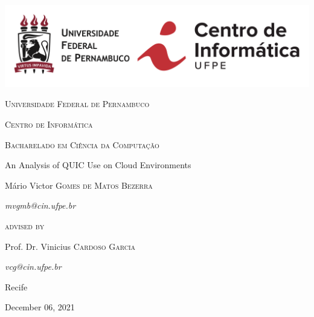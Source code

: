 \begin{titlepage}
	\centering
    \includegraphics[width=\linewidth]{figures/cin-ufpe.png}
	\vfill
    {\large\scshape Universidade Federal de Pernambuco\par}
    {\large\scshape Centro de Informática\par}
    {\large\scshape Bacharelado em Ciência da Computação\par}
	\vfill
	\vfill
	\vfill
	\vfill
	{\huge An Analysis of QUIC Use on Cloud Environments\par}
	\vfill
	{\large Mário Victor \textsc{Gomes de Matos Bezerra}\par}
	{\large\itshape mvgmb@cin.ufpe.br\par}
	\vfill
	\vfill
	\vfill
	\vfill
	{\scshape advised by\par}
	{\large Prof. Dr. Vinicius \textsc{Cardoso Garcia}\par}
	{\large\itshape vcg@cin.ufpe.br\par}
	\vfill
	\vfill
	{\large Recife\par}
	{\large December 06, 2021\par}
\end{titlepage}
